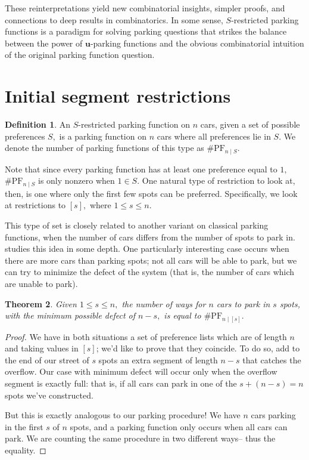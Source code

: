 \documentclass[12 pt]{amsart}
\newtheorem{theorem}{Theorem}[section]
\theoremstyle{definition} %
\newtheorem{definition}[theorem]{Definition}
\theoremstyle{remark} %
\begin{document}
These reinterpretations yield new combinatorial insights, simpler proofs, and connections to deep results in combinatorics. In some sense, $S$-restricted parking functions is a paradigm for solving parking questions that strikes the balance between the power of $\mathbf{u}$-parking functions and the obvious combinatorial intuition of the original parking function question.

\section{Initial segment restrictions}

\begin{definition}
    An $S$-restricted parking function on $n$ cars, given a set of possible preferences $S,$ is a parking function on $n$ cars where all preferences lie in $S.$ We denote the number of parking functions of this type as $\# \mathrm{PF}_{n\mid S}.$
\end{definition}

Note that since every parking function has at least one preference equal to $1,$ $\# \mathrm{PF}_{n\mid S}$ is only nonzero when $1\in S.$ One natural type of restriction to look at, then, is one where only the first few spots can be preferred. Specifically, we look at restrictions to $[s],$ where $1\le s\le n.$

This type of set is closely related to another variant on classical parking functions, when the number of cars differs from the number of spots to park in. \cite{cameron-johannsen-prellberg-schweitzer-2008} studies this idea in some depth. One particularly interesting case occurs when there are more cars than parking spots; not all cars will be able to park, but we can try to minimize the defect of the system (that is, the number of cars which are unable to park).

\begin{theorem}
    Given $1\le s\le n,$ the number of ways for $n$ cars to park in $s$ spots, with the minimum possible defect of $n-s,$ is equal to $\# \mathrm{PF}_{n \mid [s]}.$
\end{theorem}

\begin{proof}
    We have in both situations a set of preference lists which are of length $n$ and taking values in $[s]$; we'd like to prove that they coincide. To do so, add to the end of our street of $s$ spots an extra segment of length $n-s$ that catches the overflow. Our case with minimum defect will occur only when the overflow segment is exactly full: that is, if all cars can park in one of the $s+(n-s)=n$ spots we've constructed.

    But this is exactly analogous to our parking procedure! We have $n$ cars parking in the first $s$ of $n$ spots, and a parking function only occurs when all cars can park. We are counting the same procedure in two different ways-- thus the equality.
\end{proof}
\end{document}
